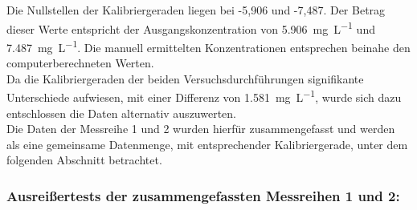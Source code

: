 	Die Nullstellen der Kalibriergeraden liegen bei -5,906 und -7,487. Der Betrag dieser Werte entspricht der Ausgangskonzentration von \SI{5,906}{\milli\gram\per\liter} und \SI{7,487}{\milli\gram\per\liter}. 
	Die manuell ermittelten Konzentrationen entsprechen beinahe den computerberechneten Werten.	\\
	
	Da die Kalibriergeraden der beiden Versuchsdurchführungen signifikante Unterschiede aufwiesen, mit einer Differenz von \SI{1,581}{\milli \gram \per\liter}, wurde sich dazu entschlossen die Daten alternativ auszuwerten.\\
	Die Daten der Messreihe 1 und 2 wurden hierfür zusammengefasst und werden als eine gemeinsame Datenmenge, mit entsprechender Kalibriergerade, unter dem folgenden Abschnitt betrachtet.
	
	\pagebreak
	
	\subsubsection*{Ausreißertests der zusammengefassten Messreihen 1 und 2:}
	
